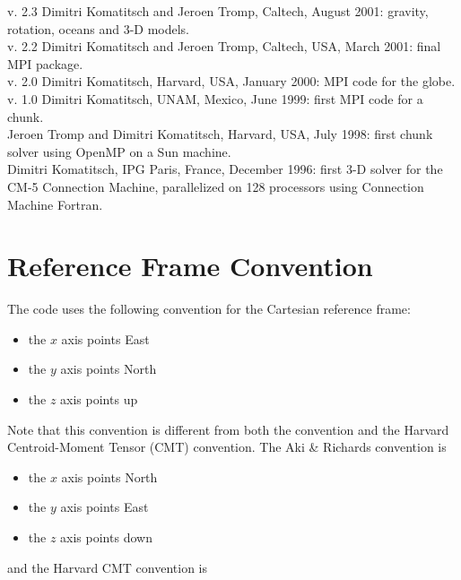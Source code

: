 \documentclass[oneside,english]{book}
\begin{document}
 v. 2.3 Dimitri Komatitsch and Jeroen Tromp, Caltech, August 2001:
                       gravity, rotation, oceans and 3-D models.\\

 v. 2.2 Dimitri Komatitsch and Jeroen Tromp, Caltech, USA, March 2001:
                       final MPI package.\\

 v. 2.0 Dimitri Komatitsch, Harvard, USA, January 2000: MPI code for the globe.\\

 v. 1.0 Dimitri Komatitsch, UNAM, Mexico, June 1999: first MPI code for a chunk.\\

 Jeroen Tromp and Dimitri Komatitsch, Harvard, USA, July 1998: first chunk solver using OpenMP on a Sun machine.\\

 Dimitri Komatitsch, IPG Paris, France, December 1996: first 3-D solver for the CM-5 Connection Machine,
    parallelized on 128 processors using Connection Machine Fortran.\\

{\small 
}{\small \par}

\appendix

\chapter{\label{cha:Reference-Frame-Convention}Reference Frame Convention}

The code uses the following convention for the Cartesian reference frame:

\begin{itemize}
\item the $x$ axis points East
\item the $y$ axis points North
\item the $z$ axis points up
\end{itemize}
Note that this convention is different from both the \citet{AkRi80}
convention and the Harvard Centroid-Moment Tensor (CMT) convention.
The Aki \& Richards convention is

\begin{itemize}
\item the $x$ axis points North
\item the $y$ axis points East
\item the $z$ axis points down
\end{itemize}
and the Harvard CMT convention is
\end{document}
